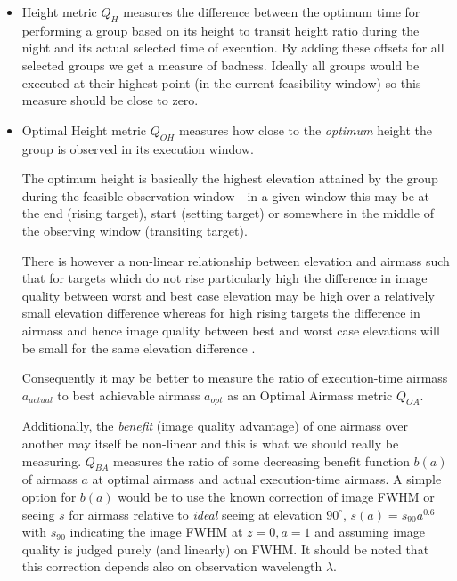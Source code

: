 \begin{itemize}
\item Height metric $Q_H$ measures the difference between the optimum time for performing a group based on its height to transit height ratio during the night and its actual selected time of execution. By adding these offsets for all selected groups we get a measure of badness. Ideally all groups would be executed at their highest point (in the current feasibility window) so this measure should be close to zero. 

\item Optimal Height metric $Q_{OH}$  measures how close to the \emph{optimum} height the group is observed in its execution window. 

The optimum height is basically the highest elevation attained by the group during the feasible observation window - in a given window this may be at the end (rising target), start (setting target) or somewhere in the middle of the observing window (transiting target). 

There is however a non-linear relationship between elevation and airmass such that for targets which do not rise particularly high the difference in image quality between worst and best case elevation may be high over a relatively small elevation difference whereas for high rising targets the difference in airmass and hence image quality between best and worst case elevations will be small for the same elevation difference .

Consequently it may be better to measure the ratio of execution-time airmass $a_{actual}$ to best achievable airmass $a_{opt}$ as an Optimal Airmass metric $Q_{OA}$. 

Additionally, the \emph{benefit} (image quality advantage) of one airmass over another may itself be non-linear and this is what we should really be measuring. $Q_{BA}$  measures the ratio of some decreasing benefit function $b(a)$ of airmass $a$ at optimal airmass and actual execution-time airmass. A simple option for $b(a)$ would be to use the known correction \cite{sarazin90eso} of image FWHM or seeing $s$ for airmass relative to \emph{ideal} seeing at elevation $90^\circ$, $s(a)=s_{90}a^{0.6}$ with $s_{90}$ indicating the image FWHM at $z=0,a=1$ and assuming image quality is judged purely (and linearly) on FWHM. It should be noted that this correction depends also on observation wavelength $\lambda$. 


\end{itemize}
